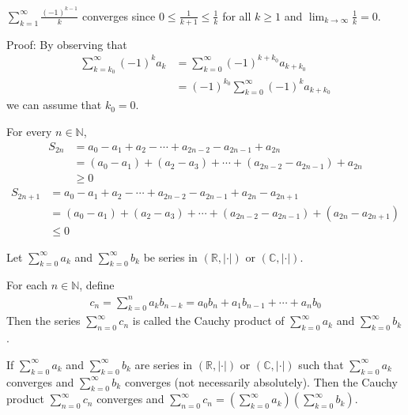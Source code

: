 \documentclass{tufte-handout}
\begin{document}
\begin{Example}
    \( \sum_{k=1}^{\infty}\frac{(-1)^{k-1}}{k}
     \) converges since \(0 \leq \frac{1}{k+1} \leq \frac{1}{k} \) for all \( k \geq 1 \) and
        \( \lim_{k \to \infty}\frac{1}{k} = 0 \).
\end{Example}
Proof: By observing that 
\begin{align}
\sum_{k=k_0}^{\infty}(-1)^{k}a_k &= \sum_{k=0}^{\infty}(-1)^{k+k_0}a_{k+k_0}\\
&= (-1)^{k_0}\sum_{k=0}^{\infty}(-1)^{k}a_{k+k_0}
\end{align}
we can assume that \( k_0 = 0 \).

For every \( n \in \mathbb{N} \),
\begin{align}
    S_{2n} &= a_0 - a_1 + a_2 - \cdots + a_{2n-2} - a_{2n-1} + a_{2n} \\
    &= (a_0 - a_1) + (a_2 - a_3) + \cdots + (a_{2n-2} - a_{2n-1}) + a_{2n} \\
    &\geq 0
\end{align}
\begin{align}
    S_{2n+1} &= a_0 - a_1 + a_2 - \cdots + a_{2n-2} - a_{2n-1} + a_{2n} - a_{2n+1} \\
    &= (a_0 - a_1) + (a_2 - a_3) + \cdots + (a_{2n-2} - a_{2n-1}) + (a_{2n} - a_{2n+1}) \\
    &\leq 0
\end{align}

\begin{Definition}
    Let \(\sum_{k=0}^{\infty}a_k\) and \(\sum_{k=0}^{\infty}b_k\) be 
    series in \((\mathbb{R}, |\cdot|)\) or \((\mathbb{C}, |\cdot|)\).

    For each \( n \in \mathbb{N} \), define 
    \begin{align}
        c_n = \sum_{k=0}^{n}a_k b_{n-k} = a_0 b_n + a_1 b_{n-1} + \cdots + a_n b_0
    \end{align}
    Then the series \( \sum_{n=0}^{\infty}c_n \) is called the Cauchy product
    of \( \sum_{k=0}^{\infty}a_k \) and \( \sum_{k=0}^{\infty}b_k \).
\end{Definition}

\begin{Proposition}
    If \(\sum_{k=0}^{\infty}a_k\) and \(\sum_{k=0}^{\infty}b_k\) are series in \((\mathbb{R}, |\cdot|)\) or \((\mathbb{C}, |\cdot|)\) such that 
    \( \sum_{k=0}^{\infty}a_k \) converges and \( \sum_{k=0}^{\infty}b_k \) converges (not necessarily absolutely).
    Then the Cauchy product \( \sum_{n=0}^{\infty}c_n \) converges
    and \( \sum_{n=0}^{\infty}c_n = (\sum_{k=0}^{\infty}a_k)(\sum_{k=0}^{\infty}b_k) \).
\end{Proposition}
\end{document}
